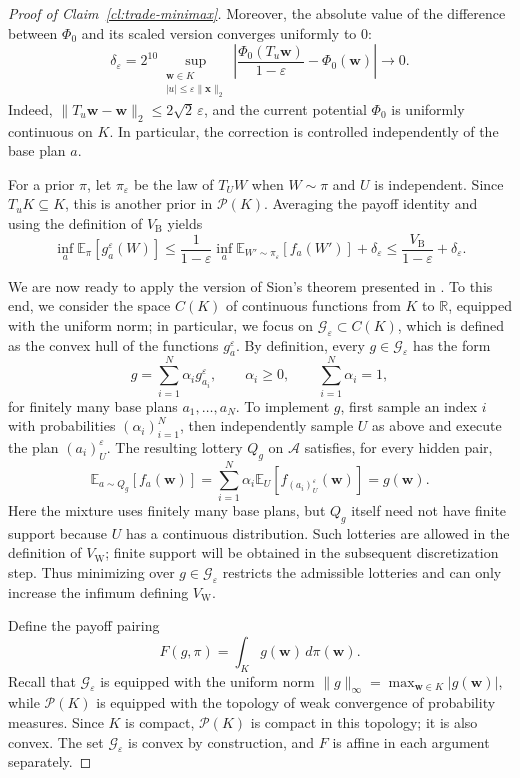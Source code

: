 \documentclass[11pt]{article}
\newcommand{\Esub}[2]{\mathbb E_{#1}\left[#2\right]}
\newcommand{\R}{\mathbb R}
\newcommand{\norm}[1]{\lVert #1\rVert_2}
\newcommand{\bx}{\boldsymbol x}
\begin{document}
\begin{proof}[Proof of Claim~\ref{cl:trade-minimax}]
Moreover, the absolute value of the difference between $\Phi_0$ and its scaled version converges uniformly to $0$:
\[
 \delta_\varepsilon
 =2^{10}\sup_{\substack{\boldsymbol w\in K\\ |u|\le\varepsilon\norm{\bx}}}
 \left|\frac{\Phi_0(T_u\boldsymbol w)}{1-\varepsilon}-\Phi_0(\boldsymbol w)\right|
 \longrightarrow0.
\]
Indeed, $\norm{T_u\boldsymbol w-\boldsymbol w}\le2\sqrt2\,\varepsilon$, and the current potential $\Phi_0$ is uniformly continuous on $K$. In particular, the correction is controlled independently of the base plan $a$.

For a prior $\pi$, let $\pi_\varepsilon$ be the law of $T_UW$ when $W\sim\pi$ and $U$ is independent. Since $T_uK\subseteq K$, this is another prior in $\mathcal P(K)$. Averaging the payoff identity and using the definition of $V_{\mathrm B}$ yields
\[
 \inf_a\Esub{\pi} {g_a^\varepsilon(W)}
 \le\frac1{1-\varepsilon}\inf_a\Esub{W'\sim\pi_\varepsilon}{f_a(W')}+\delta_\varepsilon
 \le\frac{V_{\mathrm B}}{1-\varepsilon}+\delta_\varepsilon.
\]

We are now ready to {apply} the version of Sion's theorem presented in . To this end, we consider the space $C(K)$ of {continuous} functions from $K$ to $\R$, equipped with the uniform norm; in particular, we focus on $\mathcal G_\varepsilon\subset C(K)$, which is defined as the convex hull of the functions $g_a^\varepsilon$.
By definition, every $g\in\mathcal G_\varepsilon$ has the form
\[
 g=\sum_{i=1}^N\alpha_i g_{a_i}^\varepsilon,
 \qquad \alpha_i\ge0,\qquad \sum_{i=1}^N\alpha_i=1,
\]
for finitely many base plans $a_1,\ldots,a_N$. To implement $g$, first sample an index $i$ with probabilities $(\alpha_i)_{i=1}^N$, then independently sample $U$ as above and execute the plan $(a_i)_U^\varepsilon$. The resulting lottery $Q_g$ on $\mathcal A$ satisfies, for every hidden pair,
\[
 \Esub{a\sim Q_g}{f_a(\boldsymbol w)}
 =\sum_{i=1}^N\alpha_i\Esub{U}{f_{(a_i)_U^\varepsilon}(\boldsymbol w)}
 =g(\boldsymbol w).
\]
Here the mixture uses finitely many base plans, but $Q_g$ itself need not have finite support because $U$ has a continuous distribution. Such lotteries are allowed in the definition of $V_{\mathrm W}$; finite support will be obtained in the subsequent discretization step. Thus minimizing over $g\in\mathcal G_\varepsilon$ restricts the admissible lotteries and can only increase the infimum defining $V_{\mathrm W}$.

Define the payoff pairing
\[
 F(g,\pi)=\int_K g(\boldsymbol w)\,d\pi(\boldsymbol w).
\]
{Recall that} $\mathcal G_\varepsilon$ is equipped with the uniform norm $\|g\|_\infty=\max_{\boldsymbol w\in K}|g(\boldsymbol w)|$, while $\mathcal P(K)$ {is equipped }with the topology of weak convergence of probability measures. Since $K$ is compact, $\mathcal P(K)$ is compact in this topology; it is also convex. The set $\mathcal G_\varepsilon$ is convex by construction, and $F$ is affine in each argument separately.


\end{proof}
\end{document}
